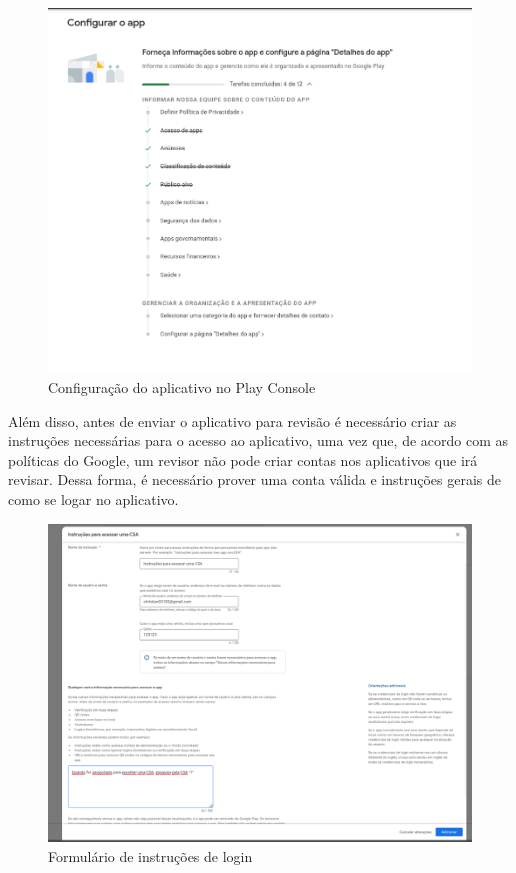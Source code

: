 \begin{figure}[h]
	\centering
\includegraphics[keepaspectratio=true,scale=0.35]{figuras/app-conf.png}
	\caption{Configuração do aplicativo no Play Console}
	\label{app-conf}
\end{figure}


Além disso, antes de enviar o aplicativo para revisão é necessário criar as instruções necessárias para o acesso ao aplicativo, uma vez que, de acordo com as políticas do Google, um revisor não pode criar contas nos aplicativos que irá revisar. Dessa forma, é necessário prover uma conta válida e instruções gerais de como se logar no aplicativo. 

\begin{figure}[h]
	\centering
\includegraphics[keepaspectratio=true,scale=0.35]{figuras/login-inst.png}
	\caption{Formulário de instruções de login}
	\label{login-inst}
\end{figure}

